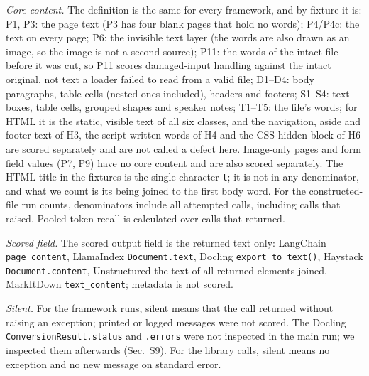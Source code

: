 \emph{Core content.} The definition is the same for every framework, and by fixture it is: P1, P3: the page text (P3 has four blank pages that hold no words); P4/P4c: the text on every page; P6: the invisible text layer (the words are also drawn as an image, so the image is not a second source); P11: the words of the intact file before it was cut, so P11 scores damaged-input handling against the intact original, not text a loader failed to read from a valid file; D1--D4: body paragraphs, table cells (nested ones included), headers and footers; S1--S4: text boxes, table cells, grouped shapes and speaker notes; T1--T5: the file's words; for HTML it is the static, visible text of all six classes, and the navigation, aside and footer text of H3, the script-written words of H4 and the CSS-hidden block of H6 are scored separately and are not called a defect here. Image-only pages and form field values (P7, P9) have no core content and are also scored separately. The HTML title in the fixtures is the single character \texttt{t}; it is not in any denominator, and what we count is its being joined to the first body word. For the constructed-file run counts, denominators include all attempted calls, including calls that raised. Pooled token recall is calculated over calls that returned.

\emph{Scored field.} The scored output field is the returned text only: LangChain \texttt{page\_content}, LlamaIndex \texttt{Document.text}, Docling \texttt{export\_to\_text()}, Haystack \texttt{Document.content}, Unstructured the text of all returned elements joined, MarkItDown \texttt{text\_content}; metadata is not scored.

\emph{Silent.} For the framework runs, silent means that the call returned without raising an exception; printed or logged messages were not scored. The Docling \texttt{ConversionResult.status} and \texttt{.errors} were not inspected in the main run; we inspected them afterwards (Sec.~S9). For the library calls, silent means no exception and no new message on standard error.

